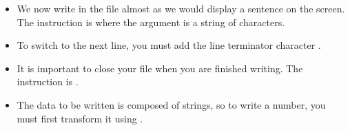 \documentclass[11pt,class=report,crop=false]{standalone}
\begin{document}
\begin{cours}
\begin{itemize}
  \item We now write in the file almost as we would display a sentence on the screen. The instruction is  where the argument is a string of characters.
  
  \item To switch to the next line, you must add the line terminator character .
  
  \item It is important to close your file when you are finished writing. The instruction is . 
   
  \item The data to be written is composed of strings, so to write a number, you must first transform it using .
\end{itemize}
  
  
\end{cours}
\end{document}
